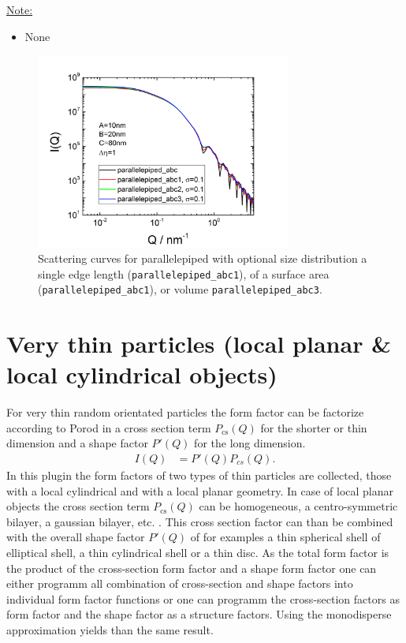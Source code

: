 \noindent\underline{Note:}
\begin{itemize}
\item None
\end{itemize}

\begin{figure}[htb]
\begin{center}
\includegraphics[width=0.75\textwidth]{../images/form_factor/anisotropic/parallelepipedABC.png}
\end{center}
\caption{Scattering curves for parallelepiped with optional size distribution a single edge length (\texttt{parallelepiped\_abc1}), of a surface area (\texttt{parallelepiped\_abc1}), or volume \texttt{parallelepiped\_abc3}.}
\label{fig:IQparallelepiped}
\end{figure}

\clearpage
\section{Very thin particles (local planar \& local cylindrical objects)}
\label{sec:very_anisotropic_particles}
For very thin random orientated particles the form factor
can be factorize according to Porod \cite{Porod1948} in a cross
section term $P_\text{cs}(Q)$ for the shorter or thin dimension and a
shape factor $P'(Q)$ for the long dimension.
\begin{align}
I(Q) &=P'(Q) P_{cs}(Q).
\end{align}
In this plugin the form factors of two types of thin
particles are collected, those with a local cylindrical and with a
local planar geometry. In case of local planar objects the cross
section term $P_\text{cs}(Q)$ can be homogeneous, a
centro-symmetric bilayer, a gaussian bilayer, etc. . This cross
section factor can than be combined with the overall shape factor
$P'(Q)$ of for examples a thin spherical shell of elliptical
shell, a thin cylindrical shell or a thin disc. As the total form
factor is the product of the cross-section form factor and a shape
form factor one can either programm all combination of
cross-section and shape factors into individual form factor
functions or one can programm the cross-section factors as form
factor and the shape factor as a structure factors. Using the
monodisperse approximation yields than the same result.

